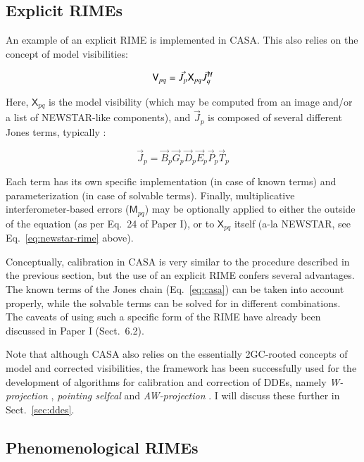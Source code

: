 \documentclass[referee]{aa}
\newcommand{\herm}{H}
\newcommand{\jones}[2]{\vec {#1}_{#2}}
\newcommand{\jonesT}[2]{\vec {#1}^{\herm}_{#2}}
\newcommand{\coh}[2]{\mathsf{{#1}}_{{#2}}}
\begin{document}
\subsection{Explicit RIMEs}

An example of an explicit RIME is implemented in CASA. This also relies on the concept of model visibilities:

\begin{equation}\label{eq:casa-rime}
\coh{V}{pq}  =  \jones{J}{p} \coh{X}{pq} \jonesT{J}{q} \\
\end{equation}

Here, $\coh{X}{pq}$ is the model visibility (which may be computed from an image and/or
a list of NEWSTAR-like components), and $\jones{J}{p}$ is composed of several different Jones terms, typically \citep[Appendix E.1]{CASA:UserRef}:

\begin{equation}\label{eq:casa}
\jones{J}{p} = \jones{B}{p} \jones{G}{p} \jones{D}{p} \jones{E}{p} \jones{P}{p} \vec  T_p
\end{equation}

Each term has its own specific implementation (in case of known terms) and parameterization (in case of solvable terms). Finally, multiplicative interferometer-based errors ($\coh{M}{pq}$) may be optionally applied to either the outside of the equation (as per Eq.~24 of Paper I), or to $\coh{X}{pq}$ itself (a-la NEWSTAR, see Eq.~\ref{eq:newstar-rime} above). 

Conceptually, calibration in CASA is very similar to the procedure described in the previous section, but the use of an explicit RIME confers several advantages. The known terms of the Jones chain (Eq.~\ref{eq:casa}) can be taken into account properly, while the solvable terms can be solved for in different combinations. The caveats of using such a specific form of the RIME have already been discussed in Paper I (Sect.~6.2).

Note that although CASA also relies on the essentially 2GC-rooted concepts of model and corrected visibilities, the framework has been successfully used for the development of algorithms for calibration and correction of DDEs, namely \emph{W-projection} \citep{Cornwell:wproj}, \emph{pointing selfcal} \citep{SB:pointing} and \emph{AW-projection} \citep{SB:imageplane}. I will discuss these further in Sect.~\ref{sec:ddes}.

\subsection{\label{sec:phenomenological}Phenomenological RIMEs}
\end{document}
